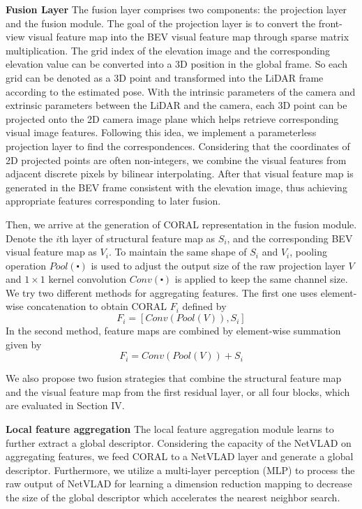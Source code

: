 \documentclass[letterpaper, 10 pt, conference]{ieeeconf}  \usepackage{tabularx}
\begin{document}
\textbf{Fusion Layer} The fusion layer comprises two components: the projection layer and the fusion module. The goal of the projection layer is to convert the front-view visual feature map into the BEV visual feature map through sparse matrix multiplication. The grid index of the elevation image and the corresponding elevation value can be converted into a 3D position in the global frame. So each grid can be denoted as a 3D point and transformed into the LiDAR frame according to the estimated pose. With the intrinsic parameters of the camera and extrinsic parameters between the LiDAR and the camera, each 3D point can be projected onto the 2D camera image plane which helps retrieve corresponding visual image features. Following this idea, we implement a parameterless projection layer to find the correspondences. Considering that the coordinates of 2D projected points are often non-integers, we combine the visual features from adjacent discrete pixels by bilinear interpolating.  After that visual feature map is generated in the BEV frame consistent with the elevation image, thus achieving appropriate features corresponding to later fusion.

Then, we arrive at the generation of CORAL representation in the fusion module. Denote the $i$th layer of structural feature map as $S_i$, and the corresponding BEV visual feature map as $V_i$. To maintain the same shape of $S_i$ and $V_i$, pooling operation $Pool(\centerdot)$ is used to adjust the output size of the raw projection layer $V$ and $1\times1$ kernel convolution $Conv(\centerdot)$ is applied to keep the same channel size. We try two different methods for aggregating features. The first one uses element-wise concatenation to obtain CORAL $F_i$ defined by
\begin{equation}\label{eq3}
F_i = \left[Conv(Pool(V)), S_i\right]
\end{equation}
In the second method, feature maps are combined by element-wise summation given by
\begin{equation}\label{eq3}
F_i = Conv(Pool(V)) + S_i
\end{equation}

We also propose two fusion strategies that combine the structural feature map and the visual feature map from the first residual layer, or all four blocks, which are evaluated in Section IV.

\textbf{Local feature aggregation} The local feature aggregation module learns to further extract a global descriptor. Considering the capacity of the NetVLAD on aggregating features, we feed CORAL to a NetVLAD layer and generate a global descriptor. Furthermore, we utilize a multi-layer perception (MLP) to process the raw output of NetVLAD for learning a dimension reduction mapping to decrease the size of the global descriptor which accelerates the nearest neighbor search.
\end{document}
